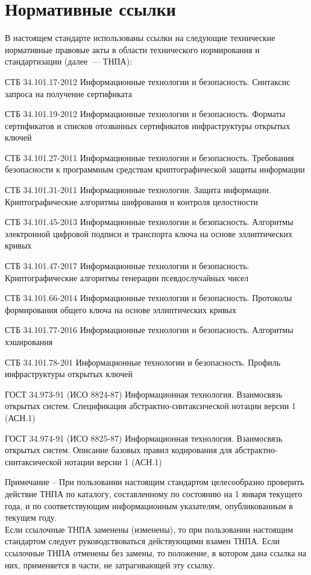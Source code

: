 \chapter{Нормативные ссылки}

В настоящем стандарте использованы ссылки на следующие технические 
нормативные правовые акты в области технического нормирования и 
стандартизации (далее~--- ТНПА): 

СТБ 34.101.17-2012 Информационные технологии и безопасность. 
Синтаксис запроса на получение сертификата
 
СТБ 34.101.19-2012 Информационные технологии и безопасность. Форматы 
сертификатов и списков отозванных сертификатов инфраструктуры открытых 
ключей 

СТБ 34.101.27-2011 Информационные технологии и безопасность. Требования 
безопасности к программным средствам криптографической защиты информации 

СТБ 34.101.31-2011 Информационные технологии. Защита информации. 
Криптографические алгоритмы шифрования и контроля целостности 

СТБ 34.101.45-2013 Информационные технологии и безопасность. 
Алгоритмы электронной цифровой подписи и транспорта 
ключа на основе эллиптических кривых 

СТБ 34.101.47-2017 Информационные технологии и безопасность. 
Криптографические алгоритмы генерации псевдослучайных чисел 

СТБ 34.101.66-2014 Информационные технологии и безопасность. Протоколы 
формирования общего ключа на основе эллиптических кривых 

СТБ 34.101.77-2016 Информационные технологии и безопасность. 
Алгоритмы хэширования

СТБ 34.101.78-201 Информационные технологии и безопасность. 
Профиль инфраструктуры открытых ключей

ГОСТ 34.973-91 (ИСО 8824-87) Информационная технология. Взаимосвязь 
открытых систем. Спецификация абстрактно-синтаксической нотации версии 1 
(АСН.1) 

ГОСТ 34.974-91 (ИСО 8825-87) Информационная технология. Взаимосвязь 
открытых систем. Описание базовых правил кодирования для 
абстрактно-синтаксической нотации версии 1 (АСН.1) 

\begin{note}
Примечание -- 
При пользовании настоящим стандартом целесообразно проверить действие 
ТНПА по каталогу, составленному по состоянию на 1 января текущего года, 
и по соответствующим информационным указателям, опубликованным в текущем году. \\
Если ссылочные ТНПА заменены (изменены), то при пользовании настоящим
стандартом следует руководствоваться действующими взамен ТНПА.
Если ссылочные ТНПА отменены без замены, то положение, в котором дана ссылка
на них, применяется в части, не затрагивающей эту ссылку.
\end{note}
